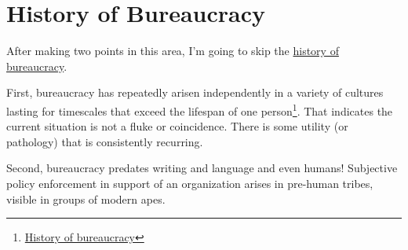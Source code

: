 \section{History of Bureaucracy}

After making two points in this area, I'm going to skip the \href{https://en.wikipedia.org/wiki/Bureaucracy#History}{history of bureaucracy}.  %

First, bureaucracy has repeatedly arisen independently in a variety of cultures lasting for timescales that exceed the lifespan of one person\footnote{\href{https://www.youtube.com/watch?v=B_nsZlcC12g}{History of bureaucracy}}. That indicates the current situation is not a fluke or coincidence. There is some utility (or pathology) that is consistently recurring. 


Second, bureaucracy predates writing and language and even humans! Subjective policy enforcement in support of an organization arises in pre-human tribes, visible in groups of modern apes. 


